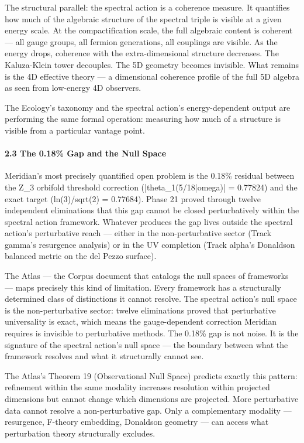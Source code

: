 The structural parallel: the spectral action is a coherence measure. It quantifies how much of the algebraic structure of the spectral triple is visible at a given energy scale. At the compactification scale, the full algebraic content is coherent — all gauge groups, all fermion generations, all couplings are visible. As the energy drops, coherence with the extra-dimensional structure decreases. The Kaluza-Klein tower decouples. The 5D geometry becomes invisible. What remains is the 4D effective theory — a dimensional coherence profile of the full 5D algebra as seen from low-energy 4D observers.


The Ecology's taxonomy and the spectral action's energy-dependent output are performing the same formal operation: measuring how much of a structure is visible from a particular vantage point.


\paragraph*{2.3 The 0.18\% Gap and the Null Space}


Meridian's most precisely quantified open problem is the 0.18\% residual between the Z\_3 orbifold threshold correction (|theta\_1(5/18|omega)| = 0.77824) and the exact target (ln(3)/sqrt(2) = 0.77684). Phase 21 proved through twelve independent eliminations that this gap cannot be closed perturbatively within the spectral action framework. Whatever produces the gap lives outside the spectral action's perturbative reach — either in the non-perturbative sector (Track gamma's resurgence analysis) or in the UV completion (Track alpha's Donaldson balanced metric on the del Pezzo surface).


The Atlas — the Corpus document that catalogs the null spaces of frameworks — maps precisely this kind of limitation. Every framework has a structurally determined class of distinctions it cannot resolve. The spectral action's null space is the non-perturbative sector: twelve eliminations proved that perturbative universality is exact, which means the gauge-dependent correction Meridian requires is invisible to perturbative methods. The 0.18\% gap is not noise. It is the signature of the spectral action's null space — the boundary between what the framework resolves and what it structurally cannot see.


The Atlas's Theorem 19 (Observational Null Space) predicts exactly this pattern: refinement within the same modality increases resolution within projected dimensions but cannot change which dimensions are projected. More perturbative data cannot resolve a non-perturbative gap. Only a complementary modality — resurgence, F-theory embedding, Donaldson geometry — can access what perturbation theory structurally excludes.


